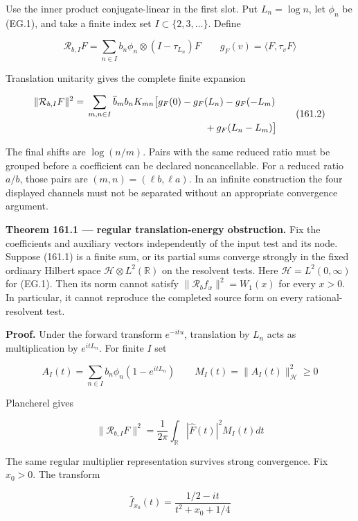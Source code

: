 \documentclass[
  11pt,
]{book}
\renewenvironment{quote}
  {\begin{tcolorbox}[
      enhanced,
      breakable,
      colback=tncream,
      colframe=tnrust,
      boxrule=0.8pt,
      arc=1.5pt,
      left=7pt,
      right=7pt,
      top=6pt,
      bottom=6pt]}
  {\end{tcolorbox}}
\begin{document}
Use the inner product conjugate-linear in the first slot. Put
\(L_n=\log n\), let \(\phi_n\) be (EG.1), and take a finite index set
\(I\subset\{2,3,\ldots\}\). Define

\[
\mathcal R_{b,I}F=\sum_{n\in I}b_n\phi_n\otimes(I-\tau_{L_n})F
\qquad g_F(v)=\langle F,\tau_vF\rangle
\tag{161.1}
\]

Translation unitarity gives the complete finite expansion

\[
\begin{aligned}
\|\mathcal R_{b,I}F\|^2
={}&\sum_{m,n\in I}\overline b_m b_nK_{mn}
\big[g_F(0)-g_F(L_n)-g_F(-L_m)\\
&\hspace{43mm}+g_F(L_n-L_m)\big]
\end{aligned}
\tag{161.2}
\]

The final shifts are \(\log(n/m)\). Pairs with the same reduced ratio
must be grouped before a coefficient can be declared noncancellable. For
a reduced ratio \(a/b\), those pairs are \((m,n)=(\ell b,\ell a)\). In
an infinite construction the four displayed channels must not be
separated without an appropriate convergence argument.

\begin{quote}
\textbf{Theorem 161.1 --- regular translation-energy obstruction.} Fix
the coefficients and auxiliary vectors independently of the input test
and its node. Suppose (161.1) is a finite sum, or its partial sums
converge strongly in the fixed ordinary Hilbert space
\(\mathcal H\otimes L^2(\mathbb R)\) on the resolvent tests. Here
\(\mathcal H=L^2(0,\infty)\) for (EG.1). Then its norm cannot satisfy
\(\|\mathcal R_bf_x\|^2=W_1(x)\) for every \(x>0\). In particular, it
cannot reproduce the completed source form on every rational-resolvent
test.
\end{quote}

\textbf{Proof.} Under the forward transform \(e^{-itu}\), translation by
\(L_n\) acts as multiplication by \(e^{itL_n}\). For finite \(I\) set

\[
A_I(t)=\sum_{n\in I}b_n\phi_n(1-e^{itL_n})
\qquad M_I(t)=\|A_I(t)\|_{\mathcal H}^2\ge0
\]

Plancherel gives

\[
\|\mathcal R_{b,I}F\|^2
=\frac1{2\pi}\int_{\mathbb R}|\widehat F(t)|^2M_I(t)dt
\tag{161.3}
\]

The same regular multiplier representation survives strong convergence.
Fix \(x_0>0\). The transform

\[
\widehat f_{x_0}(t)=\frac{1/2-it}{t^2+x_0+1/4}
\]
\end{document}
